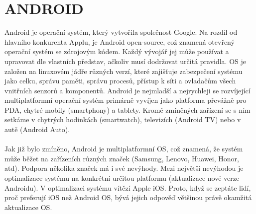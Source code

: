 \documentclass{vskpou} %
\begin{document}
\thispagestyle{empty}
\setcounter{page}{1}

\clearpage
\section{ANDROID}
Android je operační systém, který vytvořila společnost Google. Na rozdíl od hlavního konkurenta Applu, je Android open-source, což znamená otevřený operační systém se zdrojovým kódem. Každý vývojář jej může používat a upravovat dle vlastních představ, ačkoliv musí dodržovat určitá pravidla. OS je založen na linuxovém jádře různých verzí, které zajišťuje zabezpečení systému jako celku, správu paměti, správu procesů, přístup k síti a ovladačům všech vnitřních senzorů a komponentů. Android je nejmladší a nejrychleji se rozvíjející multiplatformní operační systém primárně vyvíjen jako platforma převážně pro PDA, chytré mobily (smartphony) a tablety. Kromě zmíněných zařízení se s ním setkáme v chytrých hodinkách (smartwatch), televizích (Android TV) nebo v autě (Android Auto).\cite{10} \\
\\
Jak již bylo zmíněno, Android je multiplatformní OS, což znamená, že systém může běžet na zařízeních různých značek (Samsung, Lenovo, Huawei, Honor, atd). Podpora několika značek má i své nevýhody. Mezi největší nevýhodou je optimalizace systému na konkrétní určitou platformu (aktualizace nové verze Androidu).  V optimalizaci systému vítězí Apple iOS. Proto, když se zeptáte lidí, proč preferují iOS než Android OS, bývá jejich odpověď většinou právě okamžitá aktualizace OS.\cite{10} 
\end{document}
